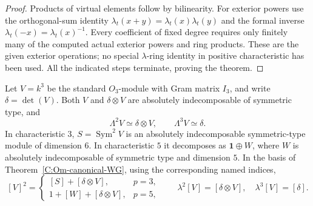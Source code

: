 \begin{proof}
Products of virtual elements follow by bilinearity. For exterior powers
use the orthogonal-sum identity
$\lambda_t(x+y)=\lambda_t(x)\lambda_t(y)$ and the formal inverse
$\lambda_t(-x)=\lambda_t(x)^{-1}$. Every coefficient of fixed degree
requires only finitely many of the computed actual exterior powers and
ring products. These are the given exterior operations; no special
$\lambda$-ring identity in positive characteristic has been used.
All the indicated steps terminate, proving the theorem.
\end{proof}

\begin{proposition}
\label{C:Om-canonical-example}
Let $V=k^3$ be the standard $O_3$-module with Gram matrix $I_3$, and
write $\delta=\det(V)$. Both $V$ and $\delta\otimes V$ are absolutely
indecomposable of symmetric type, and
\[
 \Lambda^2 V\simeq\delta\otimes V,\qquad
 \Lambda^3 V\simeq\delta .
                                                        \tag{C.3.T10}
\]
In characteristic $3$, $S=\operatorname{Sym}^2 V$ is an absolutely
indecomposable symmetric-type module of dimension $6$. In characteristic
$5$ it decomposes as $\mathbf1\oplus W$, where $W$ is absolutely
indecomposable of symmetric type and dimension $5$. In the basis of
Theorem~\ref{C:Om-canonical-WG}, using the corresponding named indices,
\[
 [V]^2=
 \begin{cases}
 [S]+[\delta\otimes V],&p=3,\\
 1+[W]+[\delta\otimes V],&p=5,
 \end{cases}
 \qquad
 \lambda^2[V]=[\delta\otimes V],\quad
 \lambda^3[V]=[\delta].                                 \tag{C.3.T11}
\]
\end{proposition}

